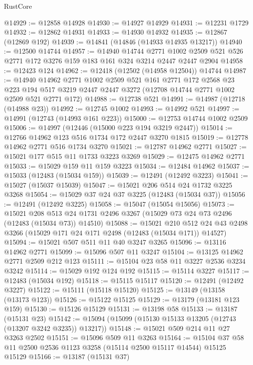 \begin{lexlean}{RustCore}
\begin{coremodule}
@14929 := @12858 @14928
@14930 := @14927 @14929
@14931 := @12231 @1729
@14932 := @12862 @14931
@14933 := @14930 @14932
@14935 := @12867 (@12869 @192)
@14939 := @14841 (@14846 (@14933 @14935 @13217))
@14940 := @12500 @14744
@14957 := @14940
    @14744
    @2771
    @1002
    @2509
    @521
    @526
    @2771
    @172
    @3276
    @159
    @183
    @161
    @324
    @3214
    @2447
    @2447
    @2904
@14958 := @12423 @124
@14962 := @12418 (@12502 (@14958 @12504)) @14744
@14987 := @14940
    @14962
    @2771
    @1002
    @2509
    @521
    @161
    @2771
    @172
    @2568
    @23
    @223
    @194
    @517
    @3219
    @2447
    @2447
    @3272
    (@12708 @14744 @2771 @1002 @2509 @521 @2771 @172)
@14988 := @12738 @521
@14991 := @14987 (@12718 (@14988 @23))
@14992 := @12745 @1002
@14993 := @14992 @521
@14997 := @14991 (@12743 (@14993 @161 @223))
@15000 := @12753 @14744 @1002 @2509
@15006 := @14997 (@12446 (@15000 @223 @194 @3219 @2447))
@15014 := @12766 @14962 @123 @516 @1734 @172 @2447 @3270 @1815
@15019 := @12778 @14962 @2771 @516 @1734 @3270
@15021 := @12787 @14962 @2771
@15027 := @15021 @177 @515 @11 @1733 @3223 @3269
@15029 := @12475 @14962 @2771
@15033 := @15029 @159 @11 @159 @3223
@15034 := @12484 @14962
@15037 := @15033 (@12483 (@15034 @159))
@15039 := @12491 (@12492 @3223)
@15041 := @15027 (@15037 @15039)
@15047 := @15021 @206 @514 @24 @1732 @3225 @3268
@15054 := @15029 @37 @24 @37 @3225 (@12483 (@15034 @37))
@15056 := @12491 (@12492 @3225)
@15058 := @15047 (@15054 @15056)
@15073 := @15021
    @208
    @513
    @24
    @1731
    @2496
    @3267
    (@15029 @73 @24 @73 @2496 (@12483 (@15034 @73)) @14510)
@15088 := @15021
    @210
    @512
    @24
    @43
    @2498
    @3266
    (@15029 @171 @24 @171 @2498 (@12483 (@15034 @171)) @14527)
@15094 := @15021 @507 @511 @11 @40 @3247 @3265
@15096 := @13116 @14962 @2771
@15099 := @15096 @507 @11 @3247
@15104 := @13125 @14962 @2771 @2509 @212 @123
@15111 := @15104 @23 @58 @11 @3227 @2536 @3234 @3242
@15114 := @15029 @192 @124 @192
@15115 := @15114 @3227
@15117 := @12483 (@15034 @192)
@15118 := @15115 @15117
@15120 := @12491 (@12492 @3227)
@15122 := @15111 (@15118 @15120)
@15125 := @13149 (@13158 (@13173 @123))
@15126 := @15122 @15125
@15129 := @13179 (@13181 @123 @159)
@15130 := @15126 @15129
@15131 := @13198 @58
@15133 := @13187 (@15131 @23)
@15142 := @15094 (@15099 (@15130 @15133 @13205 (@12743 (@13207 @3242 @3235)) @13217))
@15148 := @15021 @509 @214 @11 @27 @3263 @2502
@15151 := @15096 @509 @11 @3263
@15164 := @15104 @37 @58 @11 @2500 @2536 @1123 @3258 (@15114 @2500 @15117 @14544) @15125 @15129
@15166 := @13187 (@15131 @37)

\end{coremodule}
\end{lexlean}
